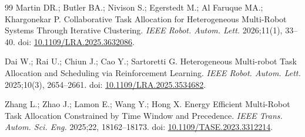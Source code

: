\documentclass[type=submission,name=IR]{oae}
\begin{document}
\begin{thebibliography}{99}
Martin DR.; Butler BA.; Nivison S.; Egerstedt M.; Al Faruque MA.; Khargonekar P.
Collaborative Task Allocation for Heterogeneous Multi-Robot Systems Through Iterative Clustering.
\textit{IEEE Robot. Autom. Lett.} 2026;11(1), 33--40.
doi: \href{https://doi.org/10.1109/LRA.2025.3632086}{10.1109/LRA.2025.3632086}.

Dai W.; Rai U.; Chiun J.; Cao Y.; Sartoretti G.
Heterogeneous Multi-robot Task Allocation and Scheduling via Reinforcement Learning.
\textit{IEEE Robot. Autom. Lett.} 2025;10(3), 2654--2661.
doi: \href{https://doi.org/10.1109/LRA.2025.3534682}{10.1109/LRA.2025.3534682}.

Zhang L.; Zhao J.; Lamon E.; Wang Y.; Hong X.
Energy Efficient Multi-Robot Task Allocation Constrained by Time Window and Precedence.
\textit{IEEE Trans. Autom. Sci. Eng.} 2025;22, 18162--18173.
doi: \href{https://doi.org/10.1109/TASE.2023.3312214}{10.1109/TASE.2023.3312214}.

\end{thebibliography}
\end{document}
